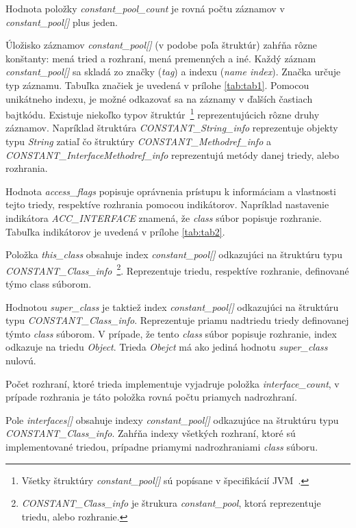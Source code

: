\documentclass[11pt,final,oneside]{fithesis}
\begin{document}
Hodnota položky \textit{constant\_pool\_count} je rovná počtu záznamov
v \textit{constant\_pool[]} plus jeden.

Úložisko záznamov \textit{constant\_pool[]} (v podobe poľa štruktúr)
zahŕňa rôzne konštanty: mená tried a rozhraní, mená premenných a iné. Každý
záznam \textit{constant\_pool[]} sa skladá zo značky (\textit{tag}) a indexu
(\textit{name index}). Značka určuje typ záznamu. Tabuľka značiek je uvedená
v prílohe \ref{tab:tab1}. Pomocou unikátneho indexu, je možné odkazovať sa na
záznamy v ďalších častiach bajtkódu. Existuje niekoľko typov
štruktúr~\footnote {Všetky štruktúry \textit{constant\_pool[]} sú popísane v
špecifikácií JVM~\cite{Lindholm:2013:JVM:2462629}.} reprezentujúcich rôzne
druhy záznamov. Napríklad štruktúra \textit{CONSTANT\_String\_info}
reprezentuje objekty typu \textit{String} zatiaľ čo štruktúry
\textit{CONSTANT\_Methodref\_info} a \textit
{CONSTANT\_InterfaceMethodref\_info} reprezentujú metódy danej triedy, alebo
rozhrania.

Hodnota \textit{access\_flags} popisuje oprávnenia prístupu k
informáciam a vlastnosti tejto triedy, respektíve rozhrania pomocou
indikátorov. Napríklad nastavenie indikátora \textit{ACC\_INTERFACE} znamená,
že \textit{class} súbor popisuje rozhranie. Tabuľka indikátorov je uvedená v
prílohe \ref{tab:tab2}.

Položka \textit{this\_class} obsahuje index \textit{constant\_pool[]}
odkazujúci na štruktúru typu \textit{CONSTANT\_Class\_info}~\footnote
{\textit{CONSTANT\_Class\_info} je štrukura \textit{constant\_pool}, ktorá
reprezentuje triedu, alebo rozhranie.}. Reprezentuje triedu, respektíve
rozhranie, definované týmo class súborom.

Hodnotou \textit{super\_class} je taktiež index \textit{constant\_pool[]}
odkazujúci na štruktúru typu \textit{CONSTANT\_Class\_info}. Reprezentuje
priamu nadtriedu triedy definovanej týmto \textit{class} súborom. V prípade,
že tento \textit{class} súbor popisuje rozhranie, index odkazuje na triedu
\textit{Object}. Trieda \textit{Obejct} má ako jediná hodnotu
\textit{super\_class} nulovú.

Počet rozhraní, ktoré trieda implementuje vyjadruje položka
\textit{interface\_count}, v prípade rozhrania je táto položka rovná počtu
priamych nadrozhraní.

Pole \textit{interfaces[]} obsahuje indexy \textit{constant\_pool[]}
odkazujúce na štruktúru typu \textit{CONSTANT\_Class\_info}. Zahŕňa indexy
všetkých rozhraní, ktoré sú implementované triedou, prípadne priamymi
nadrozhraniami \textit{class} súboru.
\end{document}
